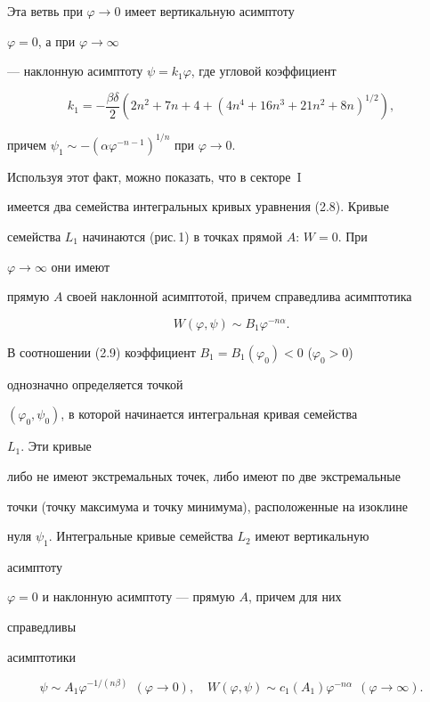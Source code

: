  


\noindent{}Эта ветвь при $\varphi\to0$ имеет вертикальную асимптоту 


$\varphi=0$, а при $\varphi\to\infty$ 


--- наклонную асимптоту $\psi=k_1\varphi$, где угловой коэффициент 


$$ 


k_1=-\frac{\beta\delta}{2}(2n^2+7n+4+(4n^4+16n^3+21n^2+8n)^{1/2}), 


$$ 


причем $\psi_1\sim-(\alpha\varphi^{-n-1})^{1/n}$ при $\varphi\to0$. 


Используя этот факт, можно показать, что в секторе~I


имеется два семейства интегральных кривых уравнения (2.8). Кривые 


семейства $L_1$ начинаются (рис.\,1) в точках прямой $A$: $W=0$. При 


$\varphi\to\infty$ они имеют 


прямую $A$ своей наклонной асимптотой, причем справедлива асимптотика 


\begin{equation} 


W(\varphi,\psi)\sim B_1\varphi^{-n\alpha}.\tag{2.9} 


\end{equation} 


В соотношении (2.9) коэффициент $B_1=B_1(\varphi_0)<0$ ($\varphi_0>0$) 


однозначно определяется точкой 


$(\varphi_0,\psi_0)$, в которой начинается интегральная кривая семейства 


$L_1$. Эти кривые 


либо не имеют экстремальных точек, либо имеют по две экстремальные 


точки (точку максимума и точку минимума), расположенные на изоклине 


нуля $\psi_1$. Интегральные кривые семейства $L_2$ имеют вертикальную 


асимптоту 


$\varphi=0$ и наклонную асимптоту --- прямую $A$, причем для них 


справедливы 


асимптотики 


\begin{equation} 


\psi\sim A_1\varphi^{-1/(n\beta)}\ \ (\varphi\to0),\quad 


W(\varphi,\psi)\sim c_1(A_1)\varphi^{-n\alpha}\ \ (\varphi\to\infty). 


\tag{2.10} 


\end{equation} 


